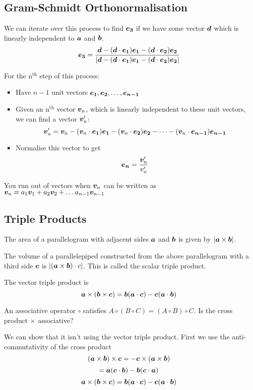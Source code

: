 \documentclass{article}
\begin{document}
    \subsection{Gram-Schmidt Orthonormalisation}
    We can iterate over this process to find \(\bm{e_{3}}\) if we have some vector \(\bm{d}\) which is linearly independent to \(\bm{a}\) and \(\bm{b}\).
    \[\bm{e_{3}} = \frac{\bm{d} - (\bm{d}\cdot\bm{e_{1}})\bm{e_{1}} - (\bm{d}\cdot\bm{e_{2}})\bm{e_{2}}}{|\bm{d} - (\bm{d}\cdot\bm{e_{1}})\bm{e_{1}} - (\bm{d}\cdot\bm{e_{2}})\bm{e_{2}}|}\]
    
    For the n\(^\text{th}\) step of this process:
    \begin{itemize}
        \item Have \(n-1\) unit vectors \(\bm{e_{1}}, \bm{e_{2}},\dotsc,\bm{e_{n-1}}\)
        \item Given an n\(^\text{th}\) vector \(\bm{v}_n\), which is linearly independent to these unit vectors, we can find a vector \(\bm{v}_n'\):
        \[\bm{v}_n' = \bm{v}_n - (\bm{v}_n\cdot \bm{e_{1}})\bm{e_{1}} - (\bm{v}_n\cdot\bm{e_{2}})\bm{e_{2}}-\dotsb-(\bm{v}_n\cdot\bm{e_{n-1}})\bm{e_{n-1}}\]
        \item Normalise this vector to get
        \[\bm{e_{n}} = \frac{\bm{v}_n'}{v_n'}\]
    \end{itemize}
    You run out of vectors when \(\bm{v}_n\) can be written as \(\bm{v}_n = a_1\bm{v}_1 + a_2\bm{v}_2+\dotsc a_{n-1}\bm{v}_{n-1}\)
    
    \subsection{Triple Products}
    The area of a parallelogram with adjacent sides \(\bm{a}\) and \(\bm{b}\) is given by \(|\bm{a}\times\bm{b}|\).
    
    The volume of a parallelepiped constructed from the above parallelogram with a third side \(\bm{c}\) is \(|(\bm{a}\times\bm{b})\cdot c|\). This is called the scalar triple product.
    
    The vector triple product is
    \[\bm{a}\times(\bm{b}\times\bm{c}) = \bm{b}(\bm{a}\cdot\bm{c}) - \bm{c}(\bm{a}\cdot\bm{b})\]
    
    \example
    An associative operator \(\circ\) satisfies \(A\circ(B\circ C) = (A\circ B)\circ C\). Is the cross product \(\times\) associative?
    
    We can show that it isn't using the vector triple product. First we use the anti-commutativity of the cross product
    \[(\bm{a}\times\bm{b})\times\bm{c} = -\bm{c}\times(\bm{a}\times\bm{b})\]
    \begin{equation}
        =\bm{a}(\bm{c}\cdot\bm{b}) - \bm{b}(\bm{c}\cdot\bm{a})\label{(axb)xc}
    \end{equation}
    \begin{equation}
        \bm{a}\times(\bm{b}\times\bm{c}) = \bm{b}(\bm{a}\cdot\bm{c}) - \bm{c}(\bm{a}\cdot\bm{b})\label{ax(bxc)}
    \end{equation}
    
\end{document}
